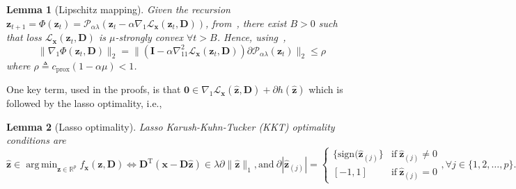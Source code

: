 \documentclass[10pt]{article} %
\newtheorem{lemma}{Lemma}[section]
\newcommand{\R}{\mathbb{R}} %
\newcommand{\D}{{\bm D}}
\newcommand{\eye}{{\bm I}}
\newcommand{\x}{{\bm x}}
\newcommand{\z}{{\bm z}}
\newcommand{\zero}{{\bm 0}}
\newcommand{\Loss}{\mathcal{L}}
\newcommand{\prox}{\mathcal{P}}
\DeclareMathOperator*{\argmin}{arg\,min}
\begin{document}
%
\begin{lemma}[Lipschitz mapping]\label{lemma:lipmapping}
 Given the recursion $\z_{t+1} = \Phi(\z_t) = \prox_{\alpha \lambda}(\z_t - \alpha \nabla_1 \Loss_{\x}(\z_t, \D))$, from~, there exist $B >0$ such that loss $\Loss_{\x}(\z_t, \D)$ is $\mu$-strongly convex $\forall t > B$. Hence, using~,
\begin{equation}
\| \nabla_1 \Phi(\z_t, \D) \|_2 = \| (\eye - \alpha \nabla_{11}^2 \Loss_{\x}(\z_t, \D)) \partial \prox_{\alpha \lambda}(\z_t) \|_2 \leq \rho
\end{equation}
where $\rho \triangleq  c_{\text{prox}} (1-\alpha\mu) < 1$.
\end{lemma}
%
One key term, used in the proofs, is that $\zero \in \nabla_1 \Loss_{\x}(\hat \z, \D) + \partial h(\hat \z)$ which is followed by the lasso optimality, i.e.,
%
\begin{lemma}[Lasso optimality]\label{lemma:kktlasso}
Lasso Karush-Kuhn-Tucker (KKT) optimality conditions are
\begin{equation}\label{eq:kkt}
\hat \z \in \argmin_{\z \in \R^p} f_{\x}(\z, \D) \Leftrightarrow \D^{\text{T}}(\x - \D \hat \z) \in \lambda \partial \| \hat \z \|_1, \text{and}\ \partial | \hat \z_{(j)} | =
\begin{cases} 
\{ \text{sign}(\hat \z_{(j)}\} &\text{if}\ \hat \z_{(j)} \neq 0\\
[-1, 1] &\text{if}\ \hat \z_{(j)} = 0
\end{cases}
,\forall j \in \{1,2,\ldots,p\}.
\end{equation}
\end{lemma}
%
\end{document}
